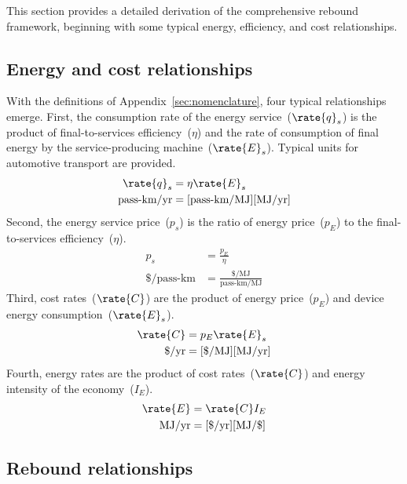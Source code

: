 
This section provides a detailed derivation of the comprehensive rebound framework,
beginning with some typical energy, efficiency, and cost relationships.


\subsection{Energy and cost relationships}
\label{sec:energy_and_cost_relationships}

With the definitions of Appendix~\ref{sec:nomenclature}, four typical relationships emerge.
First, the consumption rate of the energy service~($\rate{q}_s$)
is the product of final-to-services efficiency~($\eta$) and
the rate of consumption of final energy by the service-producing machine~($\rate{E}_s$).
Typical units for automotive transport are provided.
%
\begin{align} \label{eq:typ_qs_eta_Edot}
  \rate{q}_s &= \eta \rate{E}_s \\
  \text{pass-km/yr} &= [\text{pass-km/MJ}] [\text{MJ/yr}] \nonumber
\end{align}
%
Second, the energy service price~($p_s$) is the ratio of energy price~($p_E$) to the final-to-services efficiency~($\eta$).
%
\begin{align} \label{eq:ps_pE_eta}
  p_s &= \frac{p_E}{\eta} \\
  \text{\$/pass-km} &= \frac{\$/\text{MJ}}{\text{pass-km/MJ}} \nonumber
\end{align}
%
Third, cost rates~($\rate{C}$) are the product of energy price~($p_E$) and device energy consumption~($\rate{E}_s$).
%
\begin{align}
  \rate{C} &= p_E \rate{E}_s \\
  \text{\$/yr} &= [\text{\$/MJ}][\text{MJ/yr}] \nonumber
\end{align}
%
Fourth, energy rates are the product of cost rates~($\rate{C}$) and energy intensity of the economy~($I_E$).
%
\begin{align}
  \rate{E} &= \rate{C} I_E \\
  \text{MJ/yr} &= [\text{\$/yr}][\text{MJ/\$}] \nonumber
\end{align}


\subsection{Rebound relationships}
\label{sec:rebound_relationships}

